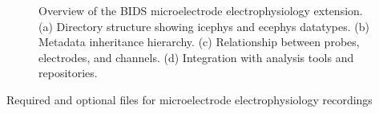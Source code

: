 \documentclass[fleqn,10pt]{wlscirep}
\begin{document}




\begin{figure}[ht]
\centering
\caption{Overview of the BIDS microelectrode electrophysiology extension.
(a) Directory structure showing icephys and ecephys datatypes.
(b) Metadata inheritance hierarchy.
(c) Relationship between probes, electrodes, and channels.
(d) Integration with analysis tools and repositories.}
\label{fig:overview}
\end{figure}


\begin{table}[ht]
\centering
\caption{Required and optional files for microelectrode electrophysiology recordings}
\label{tab:files}
\end{table}
\end{document}
